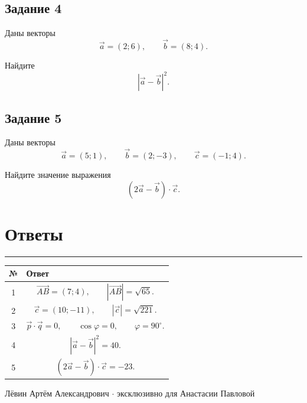 \documentclass[a4paper,12pt]{article}
\newcommand{\vect}[1]{\overrightarrow{#1}}
\newcommand{\sectionline}{%
    \par\noindent
    {\color{accent}\rule{\linewidth}{0.6pt}}
    \par
}
\begin{document}
\vspace{7mm}

\subsection*{Задание 4}

Даны векторы
\[
\vec a=(2;6),
\qquad
\vec b=(8;4).
\]

Найдите
\[
|\vec a-\vec b|^2.
\]

\vspace{7mm}

\subsection*{Задание 5}

Даны векторы
\[
\vec a=(5;1),
\qquad
\vec b=(2;-3),
\qquad
\vec c=(-1;4).
\]

Найдите значение выражения
\[
(2\vec a-\vec b)\cdot\vec c.
\]


\clearpage

\section*{\color{darkaccent}Ответы}

\sectionline

\vspace{5mm}

\renewcommand{\arraystretch}{1.45}

\begin{table}[ht]
\centering
\begin{tabularx}{\linewidth}{@{}c X@{}}
\toprule
\textbf{№} & \textbf{Ответ} \\
\midrule

1 &
\[
\vect{AB}=(7;4),
\qquad
|\vect{AB}|=\sqrt{65}.
\]
\\

2 &
\[
\vec c=(10;-11),
\qquad
|\vec c|=\sqrt{221}.
\]
\\

3 &
\[
\vec p\cdot\vec q=0,
\qquad
\cos\varphi=0,
\qquad
\varphi=90^\circ.
\]
\\

4 &
\[
|\vec a-\vec b|^2=40.
\]
\\

5 &
\[
(2\vec a-\vec b)\cdot\vec c=-23.
\]
\\

\bottomrule
\end{tabularx}
\end{table}

\vfill

\begin{center}
{\small\color{darkaccent}
Лёвин Артём Александрович
\quad\(\cdot\)\quad
эксклюзивно для Анастасии Павловой
}
\end{center}
\end{document}
